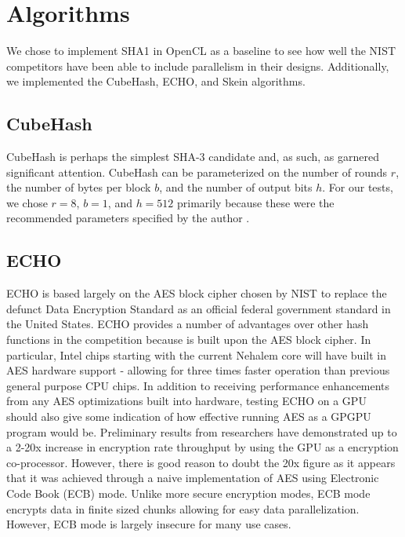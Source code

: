 
\section*{Algorithms}
We chose to implement SHA1 in OpenCL as a baseline to see how well the NIST competitors have been able to include parallelism in their designs.  Additionally, we implemented the CubeHash, ECHO, and Skein algorithms.

\subsection*{CubeHash}

CubeHash is perhaps the simplest SHA-3 candidate and, as such, as garnered significant attention.
CubeHash can be parameterized on the number of rounds $r$, the number of bytes per block $b$, and the number of output bits $h$.
For our tests, we chose $r=8$, $b=1$, and $h=512$ primarily because these were the recommended parameters specified by the author \cite{CubeHash-spec}.

\subsection*{ECHO}
ECHO is based largely on the AES block cipher chosen by NIST to replace the defunct Data Encryption Standard as an official federal government standard in the United States.
ECHO provides a number of advantages over other hash functions in the competition because is built upon the AES block cipher.
In particular, Intel chips starting with the current Nehalem core will have built in AES hardware support - allowing for three times faster operation than previous general purpose CPU chips.\cite{Westmere}
In addition to receiving performance enhancements from any AES optimizations built into hardware, testing ECHO on a GPU should also give some indication of how effective running AES as a GPGPU program would be.
Preliminary results from researchers have demonstrated up to a 2\cite{Harrison}-20x\cite{Manavski}  increase in encryption rate throughput by using the GPU as a encryption co-processor.
However, there is good reason to doubt the 20x figure as it appears that it was achieved through a naive implementation of AES using Electronic Code Book (ECB) mode.
Unlike more secure encryption modes, ECB mode encrypts data in finite sized chunks allowing for easy data parallelization.  
However, ECB mode is largely insecure for many use cases.\cite{CodeBook}\\


